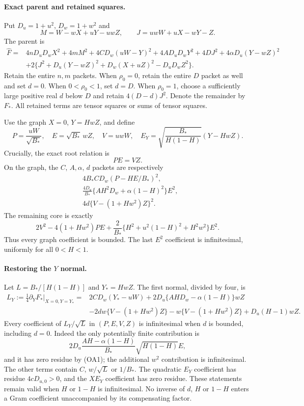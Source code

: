 \paragraph{Exact parent and retained squares.}
Put $D_u=1+u^2$, $D_w=1+w^2$ and
\[
 M=W-wX+uY-uwZ,\qquad J=uwW+uX-wY-Z.
\]
The parent is
\begin{align*}
\widehat F={}&4nD_uD_wX^2+4mM^2+4CD_w(uW-Y)^2
 +4AD_uD_wY^2+4DJ^2+4\alpha D_u(Y-wZ)^2\\
&+2\{J^2+D_u(Y-wZ)^2+D_w(X+uZ)^2-D_uD_wZ^2\}.
\end{align*}
Retain the entire $n,m$ packets. When $\rho_0=0$, retain the entire
$D$ packet as well and set $d=0$. When $0<\rho_0<1$, set $d=D$.
When $\rho_0=1$, choose a sufficiently large positive real $d$ below $D$
and retain $4(D-d)J^2$.  Denote the remainder by $F_*$.  All retained
terms are tensor squares or sums of tensor squares.

Use the graph $X=0$, $Y=HwZ$, and define
\[
 P=\frac{uW}{\sqrt{B_*}},\quad E=\sqrt{B_*}\,wZ,
 \quad V=uwW,\quad
 E_Y=\sqrt{\frac{B_*}{H(1-H)}}(Y-HwZ).
\tag{OA3}
\]
Crucially, the exact root relation is
\[
 PE=VZ.\tag{OA4}
\]
On the graph, the $C$, $A,\alpha$, $d$ packets are respectively
\begin{align*}
 &4B_*CD_w(P-HE/B_*)^2,\\
 &\frac{4D_u}{B_*}\{AH^2D_w+\alpha(1-H)^2\}E^2,\\
 &4d\{V-(1+Hw^2)Z\}^2.
\end{align*}
The remaining core is exactly
\[
 2V^2-4(1+Hw^2)PE
 +\frac{2}{B_*}\{H^2+u^2(1-H)^2+H^2w^2\}E^2.
\tag{OA5}
\]
Thus every graph coefficient is bounded.  The last $E^2$ coefficient is
infinitesimal, uniformly for all $0<H<1$.

\paragraph{Restoring the $Y$ normal.}
Let $L=B_*/[H(1-H)]$ and $Y_*=HwZ$.
The first normal, divided by four, is
\begin{align*}
 L_Y:=\frac14\partial_YF_*\big|_{X=0,Y=Y_*}
={}&2CD_w(Y_*-uW)+2D_u\{AH D_w-\alpha(1-H)\}wZ\\
&-2dw\{V-(1+Hw^2)Z\}
 -w\{V-(1+Hw^2)Z\}+D_u(H-1)wZ.
\tag{OA6}
\end{align*}
Every coefficient of $L_Y/\sqrt L$ in $(P,E,V,Z)$ is infinitesimal
when $d$ is bounded, including $d=0$.  Indeed the only potentially finite contribution is
\[
 2D_u\frac{AH-\alpha(1-H)}{B_*}\sqrt{H(1-H)}E,
\]
and it has zero residue by (OA1); the additional $w^2$ contribution is
infinitesimal.  The other terms contain $C$, $w/\sqrt L$ or $1/B_*$.
The quadratic $E_Y$ coefficient has residue $4cD_{u,0}>0$, and the
$X E_Y$ coefficient has zero residue.  These statements remain valid
when $H$ or $1-H$ is infinitesimal.  No inverse of $d$, $H$ or $1-H$ enters a Gram coefficient
unaccompanied by its compensating factor.

